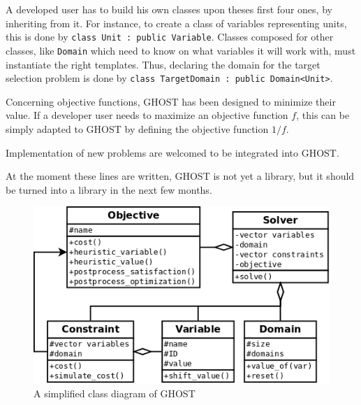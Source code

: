 \documentclass[journal]{IEEEtran}
\newcommand{\ghost}{\textsc{GHOST}\xspace}
\begin{document}
A developed user  has to build his own classes  upon theses first four
ones,  by inheriting  from  it. For  instance, to  create  a class  of
variables     representing     units,      this     is     done     by
\texttt{class~Unit~:~public~Variable}.   Classes  composed  for  other
classes, like \texttt{Domain} which need  to know on what variables it
will work with, must instantiate  the right templates. Thus, declaring
the   domain   for  the   target   selection   problem  is   done   by
\texttt{class~TargetDomain~:~public~Domain<Unit>}.

Concerning objective  functions, \ghost has been  designed to minimize
their  value.  If  a developer  user  needs to  maximize an  objective
function $f$,  this can be  simply adapted  to \ghost by  defining the
objective function $1/f$.

Implementation  of new  problems are  welcomed to  be integrated  into
\ghost.

At the  moment these lines are  written, \ghost is not  yet a library,
but it should be turned into a library in the next few months. 

\begin{figure}[tba]
  \centering
  \includegraphics[width=\columnwidth]{figs/ghost.png}
  \caption{A simplified class diagram of \ghost}
  \label{fig:ghost}
\end{figure}

  
\end{document}
